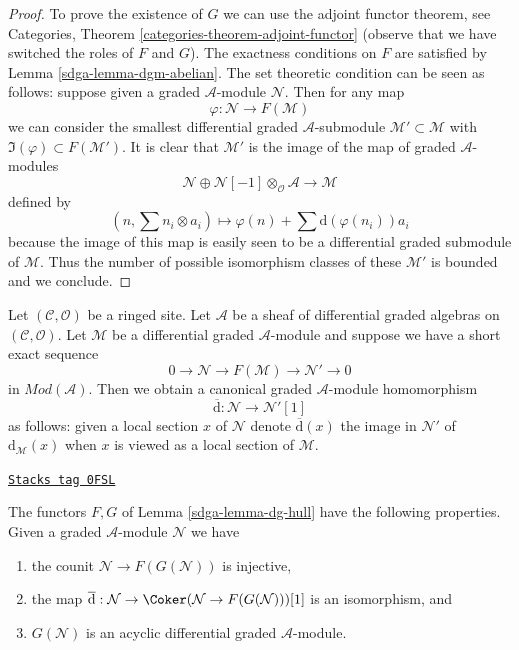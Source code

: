 \begin{proof}

To prove the existence of $G$ we can use the adjoint functor theorem, see
Categories, Theorem \ref{categories-theorem-adjoint-functor} (observe that
we have switched the roles of $F$ and $G$). The exactness conditions on
$F$ are satisfied by Lemma \ref{sdga-lemma-dgm-abelian}. The set theoretic
condition can be seen as follows: suppose given a graded $\mathcal{A}$-module
$\mathcal{N}$. Then for any map
$$
\varphi : \mathcal{N} \longrightarrow F(\mathcal{M})
$$
we can consider the smallest differential graded $\mathcal{A}$-submodule
$\mathcal{M}' \subset \mathcal{M}$ with
$\Im(\varphi) \subset F(\mathcal{M}')$.
It is clear that $\mathcal{M}'$ is the image of the map
of graded $\mathcal{A}$-modules
$$
\mathcal{N} \oplus
\mathcal{N}[-1] \otimes_\mathcal{O} \mathcal{A}
\longrightarrow
\mathcal{M}
$$
defined by
$$
(n, \sum n_i \otimes a_i) \longmapsto
\varphi(n) + \sum \text{d}(\varphi(n_i)) a_i
$$
because the image of this map is easily seen to be a differential graded
submodule of $\mathcal{M}$.
Thus the number of possible isomorphism classes of these $\mathcal{M}'$
is bounded and we conclude.
\end{proof}

Let $(\mathcal{C}, \mathcal{O})$ be a ringed site.
Let $\mathcal{A}$ be a sheaf of differential graded algebras
on $(\mathcal{C}, \mathcal{O})$. Let $\mathcal{M}$ be a differential
graded $\mathcal{A}$-module and suppose we have a short exact sequence
$$
0 \to \mathcal{N} \to F(\mathcal{M}) \to \mathcal{N}' \to 0
$$
in $\textit{Mod}(\mathcal{A})$. Then we obtain a canonical
graded $\mathcal{A}$-module homomorphism
$$
\overline{\text{d}} : \mathcal{N} \to \mathcal{N}'[1]
$$
as follows: given a local section $x$ of $\mathcal{N}$ denote
$\overline{\text{d}}(x)$ the image in $\mathcal{N}'$ of
$\text{d}_\mathcal{M}(x)$ when $x$ is viewed as a local section
of $\mathcal{M}$.

\begin{lemma}
\label{sdga-lemma-dg-hull-acyclic}
\href{https://stacks.math.columbia.edu/tag/0FSL}{\texttt{Stacks tag 0FSL}}

The functors $F, G$ of Lemma \ref{sdga-lemma-dg-hull} have
the following properties. Given a graded $\mathcal{A}$-module
$\mathcal{N}$ we have
\begin{enumerate}
\item the counit $\mathcal{N} \to F(G(\mathcal{N}))$ is injective,
\item the map $\overline{\text{d}} : \mathcal{N} \to
\Coker(\mathcal{N} \to F(G(\mathcal{N})))[1]$ is an isomorphism, and
\item $G(\mathcal{N})$ is an acyclic differential graded $\mathcal{A}$-module.
\end{enumerate}
\end{lemma}


